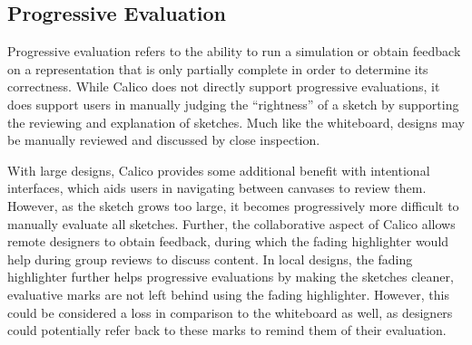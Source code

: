 


\subsection{Progressive Evaluation}
Progressive evaluation refers to the ability to run a simulation or obtain feedback on a representation that is only partially complete in order to determine its correctness. While Calico does not directly support progressive evaluations, it does support users in manually judging the ``rightness'' of a sketch by supporting the reviewing and explanation of sketches. Much like the whiteboard, designs may be manually reviewed and discussed by close inspection. 

With large designs, Calico provides some additional benefit with intentional interfaces, which aids users in navigating between canvases to review them. However, as the sketch grows too large, it becomes progressively more difficult to manually evaluate all sketches. Further, the collaborative aspect of Calico allows remote designers to obtain feedback, during which the fading highlighter would help during group reviews to discuss content. In local designs, the fading highlighter further helps progressive evaluations by making the sketches cleaner, evaluative marks are not left behind using the fading highlighter. However, this could be considered a loss in comparison to the whiteboard as well, as designers could potentially refer back to these marks to remind them of their evaluation.

